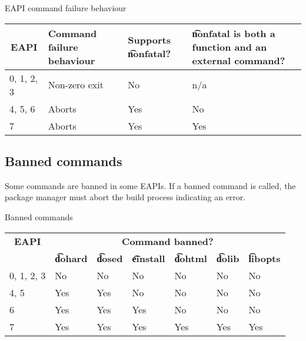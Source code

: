 \begin{centertable}{EAPI command failure behaviour}
    \label{tab:commands-die-table}
    \begin{tabular}{llll}
      \toprule
      \multicolumn{1}{c}{\textbf{EAPI}} &
      \multicolumn{1}{P{8em}}{\textbf{Command failure behaviour}} &
      \multicolumn{1}{P{5em}}{\textbf{Supports \t{nonfatal}?}} &
      \multicolumn{1}{P{12em}}{\textbf{\t{nonfatal} is both a function and an external command?}} \\
      \midrule
      0, 1, 2, 3        & Non-zero exit & No  & n/a \\
      4, 5, 6           & Aborts        & Yes & No  \\
      7                 & Aborts        & Yes & Yes \\
      \bottomrule
    \end{tabular}
\end{centertable}

\subsection{Banned commands}
\label{sec:banned-commands}

 Some commands are banned in some EAPIs. If a banned command is
called, the package manager must abort the build process indicating an error.

\begin{centertable}{Banned commands}
    \label{tab:banned-commands-table}
    \begin{tabular}{lllllll}
      \toprule
      \multicolumn{1}{c}{\textbf{EAPI}} &
      \multicolumn{6}{c}{\textbf{Command banned?}} \\
      \multicolumn{1}{c}{} &
      \multicolumn{1}{c}{\textbf{\t{dohard}}} &
      \multicolumn{1}{c}{\textbf{\t{dosed}}} &
      \multicolumn{1}{c}{\textbf{\t{einstall}}} &
      \multicolumn{1}{c}{\textbf{\t{dohtml}}} &
      \multicolumn{1}{c}{\textbf{\t{dolib}}} &
      \multicolumn{1}{c}{\textbf{\t{libopts}}} \\
      \midrule
      0, 1, 2, 3        & No  & No  & No  & No  & No  & No  \\
      4, 5              & Yes & Yes & No  & No  & No  & No  \\
      6                 & Yes & Yes & Yes & No  & No  & No  \\
      7                 & Yes & Yes & Yes & Yes & Yes & Yes \\
      \bottomrule
    \end{tabular}
\end{centertable}

